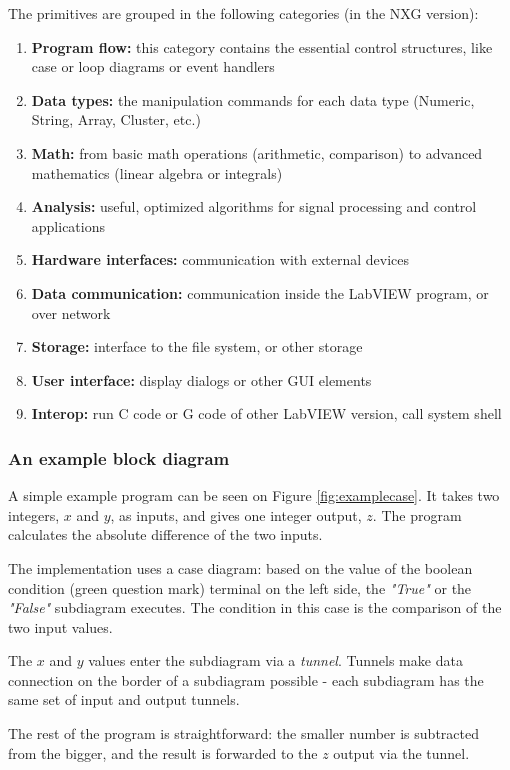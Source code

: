 The primitives are grouped in the following categories (in the NXG version):
\begin{enumerate}
   \item \textbf{Program flow:} this category contains the essential control structures, like case or loop diagrams or event handlers
   \item \textbf{Data types:} the manipulation commands for each data type (Numeric, String, Array, Cluster, etc.)
   \item \textbf{Math:} from basic math operations (arithmetic, comparison) to advanced mathematics (linear algebra or integrals)
      \item \textbf{Analysis:} useful, optimized algorithms for signal processing and control applications
      \item \textbf{Hardware interfaces:} communication with external devices
            \item \textbf{Data communication:} communication inside the LabVIEW program, or over network
                  \item \textbf{Storage:} interface to the file system, or other storage
                        \item \textbf{User interface:} display dialogs or other GUI elements
         \item \textbf{Interop:} run C code or G code of other LabVIEW version, call system shell
\end{enumerate}

\subsubsection{An example block diagram}

A simple example program can be seen on Figure \ref{fig:examplecase}. It takes two integers, $x$ and $y$, as inputs, and gives one integer output, $z$. The program calculates the absolute difference of the two inputs.

The implementation uses a case diagram: based on the value of the boolean condition (green question mark) terminal on the left side, the \textit{"True"} or the \textit{"False"} subdiagram executes. The condition in this case is the comparison of the two input values.

The $x$ and $y$ values enter the subdiagram via a \emph{tunnel}. Tunnels make data connection on the border of a subdiagram possible - each subdiagram has the same set of input and output tunnels.

The rest of the program is straightforward: the smaller number is subtracted from the bigger, and the result is forwarded to the $z$ output via the tunnel.

